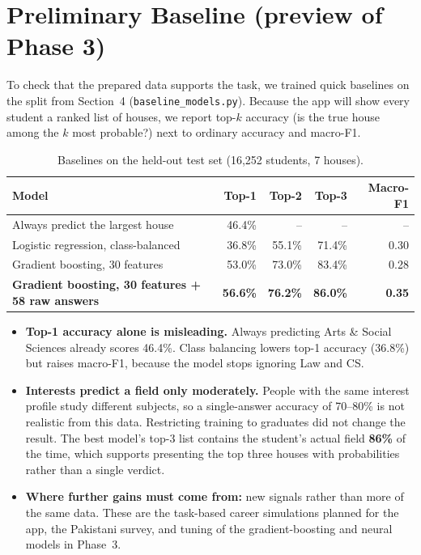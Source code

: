 \documentclass[11pt,a4paper]{article}
\begin{document}
\section{Preliminary Baseline (preview of Phase 3)}
To check that the prepared data supports the task, we trained quick baselines on the split
from Section~4 (\texttt{baseline\_models.py}). Because the app will show every student a ranked
list of houses, we report top-$k$ accuracy (is the true house among the $k$ most probable?) next
to ordinary accuracy and macro-F1.

\begin{table}[H]
\centering\small
\caption{Baselines on the held-out test set (16,252 students, 7 houses).}
\label{tab:baseline}
\begin{tabular}{@{}lrrrr@{}}
\toprule
Model & Top-1 & Top-2 & Top-3 & Macro-F1 \\
\midrule
Always predict the largest house & 46.4\% & -- & -- & -- \\
Logistic regression, class-balanced & 36.8\% & 55.1\% & 71.4\% & 0.30 \\
Gradient boosting, 30 features & 53.0\% & 73.0\% & 83.4\% & 0.28 \\
\textbf{Gradient boosting, 30 features + 58 raw answers} & \textbf{56.6\%} & \textbf{76.2\%} & \textbf{86.0\%} & \textbf{0.35} \\
\bottomrule
\end{tabular}
\end{table}

\begin{itemize}
\item \textbf{Top-1 accuracy alone is misleading.} Always predicting Arts \& Social Sciences already
      scores 46.4\%. Class balancing lowers top-1 accuracy (36.8\%) but raises macro-F1, because
      the model stops ignoring Law and CS.
\item \textbf{Interests predict a field only moderately.} People with the same interest profile
      study different subjects, so a single-answer accuracy of 70--80\% is not realistic from this
      data. Restricting training to graduates did not change the result. The best model's top-3
      list contains the student's actual field \textbf{86\%} of the time, which supports
      presenting the top three houses with probabilities rather than a single verdict.
\item \textbf{Where further gains must come from:} new signals rather than more of the same
      data. These are the task-based career simulations planned for the app, the Pakistani
      survey, and tuning of the gradient-boosting and neural models in Phase~3.
\end{itemize}
\end{document}
